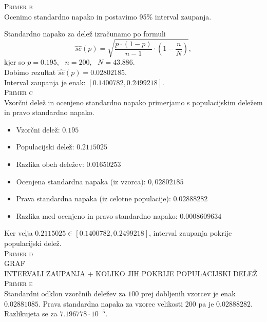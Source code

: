 \documentclass[a4paper,12pt]{article}
\begin{document}

\noindent
\textsc{Primer b}
\\
Ocenimo standardno napako in postavimo 95\% interval zaupanja.

\noindent
Standardno napako za delež izračunamo po formuli
$$ \hat{se}(p) = \sqrt{ \frac{p \cdot (1-p)}{n - 1} \cdot \left(1 - \frac{n}{N} \right)}, $$
kjer so $p = 0.195$, \ $n = 200$, \ $N = 43.886$. 
\\
Dobimo rezultat $\hat{se}(p) = 0.02802185$.
\\
Interval zaupanja je enak: $[0.1400782, 0.2499218]$.
\\


\noindent
\textsc{Primer c}
\\
Vzorčni delež in ocenjeno standardno napako primerjamo s populacijskim deležem in pravo standardno napako. 
\\
\begin{itemize}
\item Vzorčni delež: $0.195$ 
\item Populacijski delež: $0.2115025$ 
\item Razlika obeh deležev: $0.01650253$
\item Ocenjena standardna napaka (iz vzorca): $0,02802185$
\item Prava standardna napaka (iz celotne populacije):  $0.02888282$
\item Razlika med ocenjeno in pravo standardno napako: $0.0008609634$
\end{itemize}
Ker velja $0.2115025 \in [0.1400782, 0.2499218]$, interval zaupanja pokrije populacijski delež.
\\


\noindent
\textsc{Primer d}
\\
GRAF 
\\
INTERVALI ZAUPANJA + KOLIKO JIH POKRIJE POPULACIJSKI DELEŽ
\\


\noindent
\textsc{Primer e}
\\
Standardni odklon vzorčnih deležev za $100$ prej dobljenih vzorcev je enak $0.02881085$. Prava standardna napaka za vzorec velikosti $200$ pa je $0.02888282$.
Razlikujeta se za $7.196778 \cdot 10^{-5}$.
\\
\end{document}
